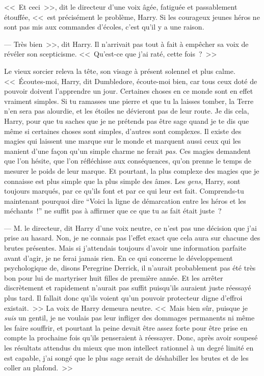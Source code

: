 <<~Et ceci~>>, dit le directeur d'une voix âgée, fatiguée et passablement étouffée, <<~est précisément le problème, Harry. Si les courageux jeunes héros ne sont pas mis aux commandes d'écoles, c'est qu'il y a une raison.

--- Très bien~>>, dit Harry. Il n'arrivait pas tout à fait à empêcher sa voix de révéler son scepticisme. <<~Qu'est-ce que j'ai raté, cette fois~?~>>

Le vieux sorcier releva la tête, son visage à présent solennel et plus calme. <<~Écoutes-moi, Harry, dit Dumbledore, écoute-moi bien, car tous ceux doté de pouvoir doivent l'apprendre un jour. Certaines choses en ce monde sont en effet vraiment simples. Si tu ramasses une pierre et que tu la laisses tomber, la Terre n'en sera pas alourdie, et les étoiles ne dévieront pas de leur route. Je dis cela, Harry, pour que tu saches que je ne prétends pas être sage quand je te dis que même si certaines choses sont simples, d'autres sont complexes. Il existe des magies qui laissent une marque sur le monde et marquent aussi ceux qui les manient d'une façon qu'un simple charme ne ferait \emph{pas}. Ces magies demandent que l'on hésite, que l'on réfléchisse aux conséquences, qu'on prenne le temps de mesurer le poids de leur marque. Et pourtant, la plus complexe des magies que je connaisse est plus simple que la plus simple des âmes. Les \emph{gens}, Harry, sont toujours marqués, par ce qu'ils font et par ce qui leur est fait. Comprends-tu maintenant pourquoi dire “Voici la ligne de démarcation entre les héros et les méchants~!” ne suffit pas à affirmer que ce que tu as fait était juste~?

--- M. le directeur, dit Harry d'une voix neutre, ce n'est pas une décision que j'ai prise au hasard. Non, je ne connais pas l'effet exact que cela aura sur chacune des brutes présentes. Mais si j'attendais toujours d'avoir une information parfaite avant d'agir, je ne ferai jamais rien. En ce qui concerne le développement psychologique de, disons Peregrine Derrick, il n'aurait probablement pas été très bon pour lui de martyriser huit filles de première année. Et les arrêter discrètement et rapidement n'aurait pas suffit puisqu'ils auraient juste réessayé plus tard. Il fallait donc qu'ils voient qu'un pouvoir protecteur digne d'effroi existait.~>> La voix de Harry demeura neutre. <<~Mais bien sûr, puisque je \emph{suis} un gentil, je ne voulais pas leur infliger des dommages permanents ni même les faire souffrir, et pourtant la peine devait être assez forte pour être prise en compte la prochaine fois qu'ils penseraient à réessayer. Donc, après avoir soupesé les résultats attendus du mieux que mon intellect rationnel à un degré limité en est capable, j'ai songé que le plus sage serait de déshabiller les brutes et de les coller au plafond.~>>

